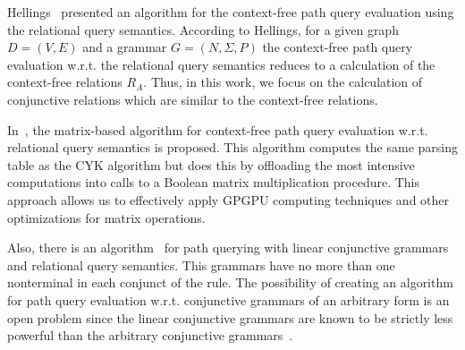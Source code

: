 Hellings~\cite{hellingsRelational} presented an algorithm for the context-free path query evaluation using the relational query semantics. According to Hellings, for a given graph $D = (V, E)$ and a grammar $G = (N, \Sigma, P)$ the context-free path query evaluation w.r.t. the relational query semantics reduces to a calculation of the context-free relations $R_A$. Thus, in this work, we focus on the calculation of conjunctive relations which are similar to the context-free relations.

In~\cite{azimov2018context}, the matrix-based algorithm for context-free path query evaluation w.r.t. relational query semantics is proposed. This algorithm computes the same parsing table as the CYK algorithm but does this by offloading the most intensive computations into calls to a Boolean matrix multiplication procedure. This approach allows us to effectively apply GPGPU computing techniques and other optimizations for matrix operations.

Also, there is an algorithm~\cite{zhang2017context} for path querying with linear conjunctive grammars and relational query semantics. This grammars have no more than one nonterminal in each conjunct of the rule. The possibility of creating an algorithm for path query evaluation w.r.t. conjunctive grammars of an arbitrary form is an open problem since the linear conjunctive grammars are known to be strictly less powerful than the arbitrary conjunctive grammars~\cite{okhotinConjAndBool}.